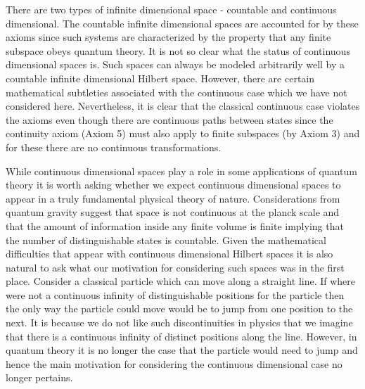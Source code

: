 \documentclass[12pt]{article}
\begin{document}
There are two types of infinite dimensional space - countable and
continuous dimensional.  The countable infinite dimensional spaces are
accounted for by these axioms since
such systems are characterized by the property that any finite subspace
obeys quantum theory.
It is not so clear what the status of continuous dimensional spaces is.
Such spaces can always be modeled arbitrarily well by a countable
infinite dimensional Hilbert space.  However, there are certain
mathematical subtleties associated with the continuous case which we
have not considered here.  Nevertheless, it is clear that the classical
continuous
case violates the axioms even though there are continuous paths between
states since the continuity axiom (Axiom 5) must also apply to finite
subspaces (by Axiom 3) and for these there are no continuous
transformations.


While continuous dimensional spaces play a role in some
applications of quantum theory it is worth asking whether we expect
continuous dimensional spaces to appear in a truly fundamental physical
theory of nature.  Considerations from quantum gravity suggest that
space is not continuous at the planck scale and that the amount of
information inside any finite volume is finite implying that the
number of distinguishable states is countable.  Given the mathematical
difficulties that appear with continuous dimensional Hilbert spaces it
is also natural to ask what our motivation for considering such spaces
was in the first place.  Consider a classical particle which can move along a
straight line.  If where were not a continuous infinity of distinguishable
positions for the particle then the only way the particle could move
would be to jump from one position to the next. It is because we do not
like such discontinuities in physics that we imagine that
there is a continuous infinity of distinct positions along the line.
However, in
quantum theory it is no longer the case that the particle would need to
jump and hence the main motivation for considering the continuous
dimensional case no longer pertains.
\end{document}
